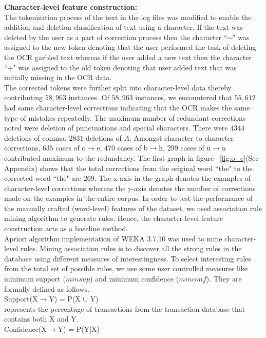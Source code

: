 \documentclass{sig-alternate}
\begin{document}
\begin{enumerate}
\begin{itemize}
\textbf{Character-level feature construction:}\\
The tokenization process of the text in the log files was modified to enable the addition and deletion classification of text using a character. If the text was deleted by the user as a part of correction process then the character ``$\sim$" was assigned to the new token denoting that the user performed the task of deleting the OCR garbled text whereas if the user added a new text  then the character ``+" was assigned to the old token denoting that user added text that was initially missing in the OCR data.\\
The corrected tokens were further split into character-level data thereby contributing $58,963$ instances. Of $58,963$ instances, we encountered that $55,612$ had same character-level corrections indicating that the OCR makes the same type of mistakes repeatedly. The maximum number of redundant corrections noted were deletion of punctuations and special characters. There were $4344$ deletions of comma, $2831$ deletions of $\ddot{A}$. Amongst character to character corrections, $635$ cases of o$\rightarrow$e, $470$ cases of b$\rightarrow$h, 299 cases of u$\rightarrow$n contributed maximum to the redundancy. The first graph in figure ~\ref{fig:o_e}(See Appendix) shows that the total corrections from the original word ``tbe" to the corrected word ``the" are $269$. 
The x-axis in the graph denotes the examples of character-level corrections whereas the y-axis denotes the number of corrections made on the examples in the entire corpus. In order to test the performance of the manually crafted (word-level) features of the dataset, we used association rule mining algorithm to generate rules. Hence, the character-level feature construction acts as a baseline method.\\
Apriori algorithm \cite{Agrawal1994} implementation of WEKA 3.7.10 was used to mine character-level rules. Mining association rules is to discover all the strong rules in the database using different measures of interestingness. To select interesting rules from the total set of possible rules, we use some user controlled measures like minimum support ($minsup$) and minimum confidence ($minconf$). They are formally defined as follows. \\
Support(X$\rightarrow$Y) = P(X $\cup$ Y)\\
represents the percentage of transactions from the transaction database that contains both X and Y.\\
Confidence(X$\rightarrow$Y) = P(Y|X)\\ 

\end{itemize}
\end{enumerate}
\end{document}
